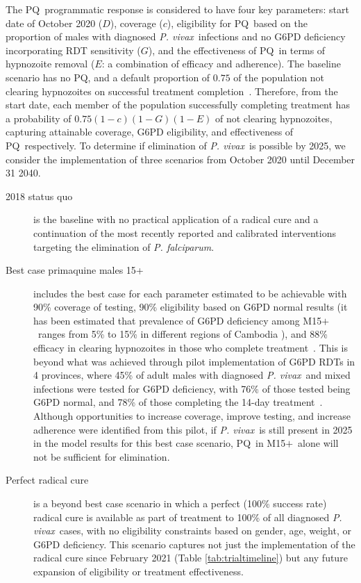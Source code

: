 \documentclass[doublespacing]{bmcart}
\newcommand{\pv}{\textit{P. vivax}}
\newcommand{\pf}{\textit{P. falciparum}}
\newcommand{\males}{M15$+$}
\newcommand{\pq}{PQ}
\begin{document}
The \pq~programmatic response is considered to have four key parameters: start date of October 2020 ($D$), coverage ($c$), eligibility for \pq~based on the proportion of males with diagnosed \pv~infections and no G6PD deficiency incorporating RDT sensitivity ($G$), and the effectiveness of \pq~in terms of hypnozoite removal ($E$: a combination of efficacy and adherence). The baseline scenario has no \pq, and a default proportion of $0.75$ of the population not clearing hypnozoites on successful treatment completion~\cite{commons2020estimating}. Therefore, from the start date, each member of the population successfully completing treatment has a probability of $0.75(1-c)(1-G)(1-E)$ of not clearing hypnozoites, capturing attainable coverage, G6PD eligibility, and effectiveness of \pq~respectively.  To determine if elimination of \pv~is possible by 2025, we consider the implementation of three scenarios from October 2020 until December 31 2040.
\begin{description}
\item [2018 status quo] is the baseline with no practical application of a radical cure and a continuation of the most recently reported and calibrated interventions targeting the elimination of \pf.

\item [Best case primaquine males 15+] includes the best case for each parameter estimated to be achievable with 90\% coverage of testing, 90\% eligibility based on G6PD normal results (it has been estimated that prevalence of G6PD deficiency among \males~ranges from 5\% to 15\% in different regions of Cambodia \cite{khim2013g6pd, kim2011performance}), and 88\% efficacy in clearing hypnozoites in those who complete treatment~\cite{commons2020estimating}. This is beyond what was achieved through pilot implementation of G6PD RDTs in 4 provinces, where 45\% of adult males with diagnosed \pv~and mixed infections were tested for G6PD deficiency, with 76\% of those tested being G6PD normal, and 78\% of those completing the 14-day treatment~\cite{brief_g6pdtests_2020}. Although opportunities to increase coverage, improve testing, and increase adherence were identified from this pilot, if \pv~is still present in 2025 in the model results for this best case scenario, \pq~in \males~alone will not be sufficient for elimination.

\item [Perfect radical cure] is a beyond best case scenario in which a perfect (100\% success rate) radical cure is available as part of treatment to 100\% of all diagnosed \pv~cases, with no eligibility constraints based on gender, age, weight, or G6PD deficiency. This scenario captures not just the implementation of the radical cure since February 2021 (Table \ref{tab:trialtimeline}) but any future expansion of eligibility or treatment effectiveness. 
\end{description}
\end{document}
